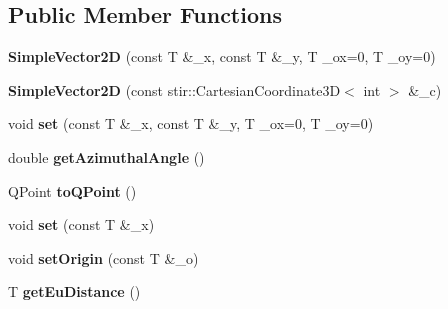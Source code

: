 \subsection*{Public Member Functions}
\begin{DoxyCompactItemize}
\item 
\mbox{\label{classViewer_1_1SimpleVector2D_a895eedbd1b2acc860c3fc2bb3c733398}} 
{\bfseries Simple\+Vector2D} (const T \&\+\_\+x, const T \&\+\_\+y, T \+\_\+ox=0, T \+\_\+oy=0)
\item 
\mbox{\label{classViewer_1_1SimpleVector2D_aae8702358d9b0e58f38a8d5e003ba82c}} 
{\bfseries Simple\+Vector2D} (const stir\+::\+Cartesian\+Coordinate3D$<$ int $>$ \&\+\_\+c)
\item 
\mbox{\label{classViewer_1_1SimpleVector2D_ab1560d4769dad5fa8bd88f34bfdc1beb}} 
void {\bfseries set} (const T \&\+\_\+x, const T \&\+\_\+y, T \+\_\+ox=0, T \+\_\+oy=0)
\item 
\mbox{\label{classViewer_1_1SimpleVector2D_a95e4bbcfc51a28ed3944f378183dcd4d}} 
double {\bfseries get\+Azimuthal\+Angle} ()
\item 
\mbox{\label{classViewer_1_1SimpleVector2D_afc891cd6fc33e5bcf8da2494168f6c21}} 
Q\+Point {\bfseries to\+Q\+Point} ()
\item 
\mbox{\label{classViewer_1_1SimpleVector1D_a6b8fdb4e646f7826ce8ccfb41c4c45db}} 
void {\bfseries set} (const T \&\+\_\+x)
\item 
\mbox{\label{classViewer_1_1SimpleVector1D_ac531dcabcb8b7d26125aedb2bc23a294}} 
void {\bfseries set\+Origin} (const T \&\+\_\+o)
\item 
\mbox{\label{classViewer_1_1SimpleVector1D_a8b9416bd2f5f50d35b1b9f0adff516eb}} 
T {\bfseries get\+Eu\+Distance} ()
\end{DoxyCompactItemize}
